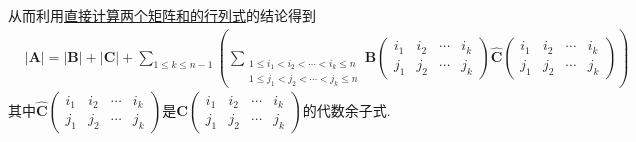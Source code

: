 \documentclass[lang=cn,newtx,10pt,scheme=chinese]{elegantbook}
\begin{document}
\begin{solution}
从而利用\hyperref[proposition:直接计算两个矩阵和的行列式]{直接计算两个矩阵和的行列式}的结论得到
\begin{align}\label{eq(行列式):1.5式}
&|\boldsymbol{A}| = |\boldsymbol{B}| + |\boldsymbol{C}| + \sum_{1\leqslant k\leqslant n - 1}\left(\sum_{\begin{array}{c}
1\leqslant i_1 < i_2 < \cdots < i_k\leqslant n\\
1\leqslant j_1 < j_2 < \cdots < j_k\leqslant n
\end{array}}\boldsymbol{B}\left(\begin{matrix}
i_1 & i_2 & \cdots & i_k\\
j_1 & j_2 & \cdots & j_k
\end{matrix}\right)\widehat{\boldsymbol{C}}\left(\begin{matrix}
i_1 & i_2 & \cdots & i_k\\
j_1 & j_2 & \cdots & j_k
\end{matrix}\right)\right)
\end{align}
其中\(\widehat{\boldsymbol{C}}\left(\begin{matrix}
i_1 & i_2 & \cdots & i_k\\
j_1 & j_2 & \cdots & j_k
\end{matrix}\right)\)是\(\boldsymbol{C}\left(\begin{matrix}
i_1 & i_2 & \cdots & i_k\\
j_1 & j_2 & \cdots & j_k
\end{matrix}\right)\)的代数余子式.


\end{solution}
\end{document}
